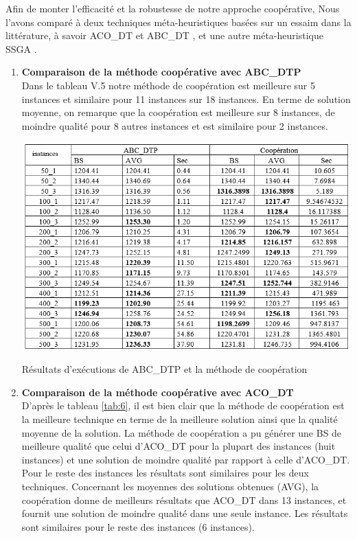 Afin de monter l’efficacité et la robustesse de notre approche coopérative, Nous l’avons comparé à deux techniques méta-heuristiques basées sur un essaim dans la littérature, à savoir ACO\_DT \cite{sundar2015ant} et ABC\_DT \cite{karaboga2008performance}, et une autre méta-heuristique SSGA \cite{sundar2014steady} .


\begin{enumerate}[label=\alph*)]
	\item \textbf{Comparaison de  la méthode coopérative avec ABC\_DTP}\\
	Dans le tableau V.5 notre méthode de coopération est meilleure sur 5 instances et similaire pour 11 instances sur 18 instances. En terme de solution moyenne, on remarque que la coopération est meilleure sur 8 instances, de moindre qualité pour 8 autres instances et est similaire pour 2 instances.
	
\begin{table}[H]
	\includegraphics[width=15cm,height=8cm]{Chap5/t5.png}
	\caption{Résultats d’exécutions de ABC\_DTP et la méthode de coopération}
	\label{tab:5}
\end{table}

	\item \textbf{Comparaison de  la méthode coopérative avec ACO\_DT}\\
	D’après le tableau \ref{tab:6}, il est bien clair que la méthode de coopération est la meilleure technique en terme de la meilleure solution ainsi que la qualité moyenne de la solution. La méthode de coopération a pu générer une BS de meilleure qualité que celui d’ACO\_DT pour la plupart des instances (huit instances) et une solution de moindre qualité par rapport à celle d’ACO\_DT. Pour le reste des instances les résultats sont similaires pour les deux techniques. Concernant les moyennes des solutions obtenues (AVG), la coopération donne de meilleurs résultats que ACO\_DT dans 13 instances, et fournit une solution de moindre qualité dans une seule instance. Les résultats sont similaires pour le reste des instances (6 instances).
	

\end{enumerate}
